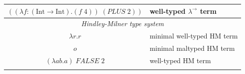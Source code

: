 \documentclass[table, a4paper, 10pt]{book}
\begin{document}
\begin{table}[H]
\begin{tabular}{cl}
\multicolumn{1}{|c|}{$((\lambda f:\mathrm{(Int \to Int)}.(f\;\mathit{4}))\;(\mathit{PLUS}\;\mathit{2}))$}           & \multicolumn{1}{l|}{well-typed $\lambda^\to$ term}                           \\ \hline
\multicolumn{2}{|c|}{\scriptsize \textit{Hindley-Milner type system}}                                                                                                                              \\ \hline
\multicolumn{1}{|c|}{$\lambda r.r$}                                                                                 & \multicolumn{1}{l|}{minimal well-typed HM term}                              \\ \hline
\multicolumn{1}{|c|}{$o$}                                                                                           & \multicolumn{1}{l|}{minimal maltyped HM term}                                \\ \hline
\multicolumn{1}{|c|}{$(\lambda ab.a)\;\mathit{FALSE}\;\mathit{2}$}                                                  & \multicolumn{1}{l|}{well-typed HM term}                                      \\ \hline
\multicolumn{1}{l}{}                                                                                                &                                                                             
\end{tabular}
\end{table}
\end{document}
